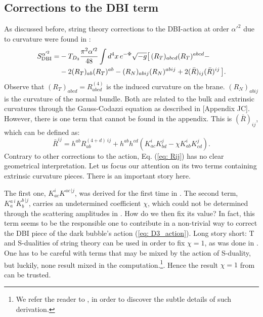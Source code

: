 \subsection*{Corrections to the DBI term}

As discussed before, string theory corrections to the DBI-action at order $\alpha '^2$ due to curvature were found in \cite{Bachas:1999aa}:
\begin{equation}\label{eq: correction_DBI}
\begin{aligned}
     S_{\rm DBI}^{\alpha'^{2}} =  &-T_{D_{3}} \frac{\pi^2 \alpha '^2}{48} \int d^4 x\,  e^{-\Phi} \sqrt{-g} \big [ \, (R_T)_{abcd} (R_T)^{abcd}-\\
     &-2(R_T)_{ab} (R_T)^{ab}-(R_N)_{abij} (R_N)^{abij}+2(\bar{R})_{ij} (\bar{R})^{ij}\, \big].
\end{aligned}
\end{equation}
Observe that $(R_T)_{abcd}=R^{(4)}_{abcd}$ is the induced curvature on the brane. $(R_N)_{abij}$ is the curvature of the normal bundle. Both are related to the bulk and extrinsic curvatures through the Gauss-Codazzi equation as described in [Appendix JC]. However, there is one term that cannot be found in the appendix. This is $(\bar{R})_{ij}$, which can be defined as:
\begin{equation}\label{eq: Rij}
 \bar{R}^{ij}= h^{ab} R^{(4+d) \: ij}_{ab}+ h^{ab} h^{cd} \left(K^i _{ac} K^j _{bd} - \chi K^i _{ab} K^j _{cd}\right).
\end{equation}
Contrary to other corrections to the action, Eq. (\ref{eq: Rij}) has no clear geometrical interpretation. Let us focus our attention on its two terms containing extrinsic curvature pieces. There is an important story here.

The first one, $K^i _{ac} K^{ac \, |j}$, was derived for the first time in \cite{Bachas:1999aa}. The second term, $K^{a\: i} _{a} K^{b\,|j}_b$, carries an undetermined coefficient $\chi$, which could not be determined through the scattering amplitudes in \cite{Bachas:1999aa}. How do we then fix its value? In fact, this term seems to be the responsible one to contribute in a non-trivial way to correct the DBI piece of the dark bubble's action (\ref{eq: D3_action}). Long story short: T and S-dualities of string theory can be used in order to fix $\chi = 1$, as was done in \cite{Jalali:2015aa}. One has to be careful with terms that may be mixed by the action of S-duality, but luckily, none result mixed in the computation.\footnote{We refer the reader to \cite{Danielsson:2024aa}, in order to discover the subtle details of such derivation.}. Hence the result $\chi = 1$ from \cite{Jalali:2015aa} can be trusted.


